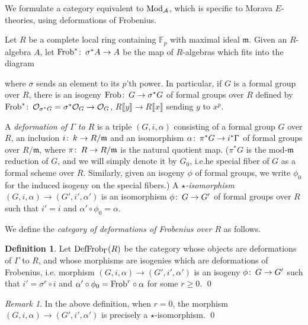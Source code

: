 \documentclass{gtpart}
\theoremstyle{definition}
\newtheorem{defn}[thm]{Definition}
\theoremstyle{remark}
\newtheorem{rmk}[thm]{Remark}
\def\co{\colon\thinspace}
\newcommand{\mb}[1]{\mathbb{#1}}
\newcommand{\mf}[1]{\mathfrak{#1}}
\newcommand{\CA}{{\cal A}}
\newcommand{\Mod}{{\rm Mod}}
\newcommand{\Frob}{{\rm Frob}}
\newcommand{\CO}{{\cal O}}
\newcommand{\DF}{{{\rm DefFrob}_\Gamma}}
\begin{document}
We formulate a category equivalent to $\Mod_\CA$, which is specific to Morava 
$E$-theories, using deformations of Frobenius.  

Let $R$ be a complete local ring containing ${\mb F}_p$ with maximal ideal 
$\mf m$.  Given an $R$-algebra $A$, let $\Frob^*\co \sigma^*A \to A$ be the 
map of $R$-algebras which fits into the diagram 
\begin{center}
\end{center}
where $\sigma$ sends an element to its $p$'th power.  In particular, if $G$ is 
a formal group over $R$, there is an isogeny $\Frob\co G \to \sigma^*G$ of 
formal groups over $R$ defined by 
$\Frob^*\co \CO_{\sigma^*G} = \sigma^*\CO_G \to \CO_G$, 
$R \llbracket y \rrbracket \to R \llbracket x \rrbracket$ sending $y$ to 
$x^p$.  

A {\em deformation of $\Gamma$ to $R$} is a triple $(G,i,\alpha)$ consisting 
of a formal group $G$ over $R$, an inclusion $i\co k \to R/\mf m$ and an 
isomorphism $\alpha\co \pi^*G \to i^*\Gamma$ of formal groups over $R/\mf m$, 
where $\pi\co R \to R/\mf m$ is the natural quotient map.  ($\pi^*G$ is the 
mod-$\mf m$ reduction of $G$, and we will simply denote it by $G_0$, 
i.e.he special fiber of $G$ as a formal scheme over $R$.  
Similarly, given an isogeny $\phi$ of formal groups, we write $\phi_0$ for the 
induced isogeny on the special fibers.)  A {\em $\star$-isomorphism 
$(G,i,\alpha) \to (G',i',\alpha')$} is an isomorphism $\phi\co G \to G'$ of 
formal groups over $R$ such that $i' = i$ and $\alpha' \circ \phi_0 = \alpha$.  

We define the {\em category of deformations of Frobenius over $R$} as follows.  
\begin{defn}
 Let $\DF(R)$ be the category whose objects are deformations of $\Gamma$ to 
 $R$, and whose morphisms are isogenies which are deformations of Frobenius, 
 i.e. morphism $(G,i,\alpha) \to (G',i',\alpha')$ is an isogeny 
 $\phi\co G \to G'$ such that $i' = \sigma^r \circ i$ and 
 $\alpha' \circ \phi_0 = \Frob^r \circ \alpha$ for some $r \geq 0$.  \qed
\end{defn}
\begin{rmk}
\label{rmk:star}
 In the above definition, when $r = 0$, the morphism 
 $(G,i,\alpha) \to (G',i',\alpha')$ is precisely a $\star$-isomorphism.  \qed
\end{rmk}
\end{document}
